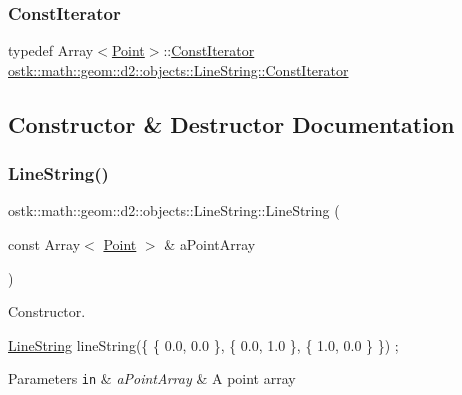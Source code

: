 \subsubsection{\texorpdfstring{Const\+Iterator}{ConstIterator}}
{\footnotesize\ttfamily typedef Array$<$\hyperlink{classostk_1_1math_1_1geom_1_1d2_1_1objects_1_1_point}{Point}$>$\+::\hyperlink{classostk_1_1math_1_1geom_1_1d2_1_1objects_1_1_line_string_a29e6326c716bef2ec438534cfdc1e118}{Const\+Iterator} \hyperlink{classostk_1_1math_1_1geom_1_1d2_1_1objects_1_1_line_string_a29e6326c716bef2ec438534cfdc1e118}{ostk\+::math\+::geom\+::d2\+::objects\+::\+Line\+String\+::\+Const\+Iterator}}



\subsection{Constructor \& Destructor Documentation}
\mbox{\label{classostk_1_1math_1_1geom_1_1d2_1_1objects_1_1_line_string_ae99b409ec3eddf804a7c83f2452b1249}} 
\subsubsection{\texorpdfstring{Line\+String()}{LineString()}}
{\footnotesize\ttfamily ostk\+::math\+::geom\+::d2\+::objects\+::\+Line\+String\+::\+Line\+String (\begin{DoxyParamCaption}\item[{const Array$<$ \hyperlink{classostk_1_1math_1_1geom_1_1d2_1_1objects_1_1_point}{Point} $>$ \&}]{a\+Point\+Array }\end{DoxyParamCaption})}



Constructor. 


\begin{DoxyCode}
\hyperlink{classostk_1_1math_1_1geom_1_1d2_1_1objects_1_1_line_string_ae99b409ec3eddf804a7c83f2452b1249}{LineString} lineString(\{ \{ 0.0, 0.0 \}, \{ 0.0, 1.0 \}, \{ 1.0, 0.0 \} \}) ;
\end{DoxyCode}



\begin{DoxyParams}[1]{Parameters}
\mbox{\tt in}  & {\em a\+Point\+Array} & A point array \\
\hline
\end{DoxyParams}


